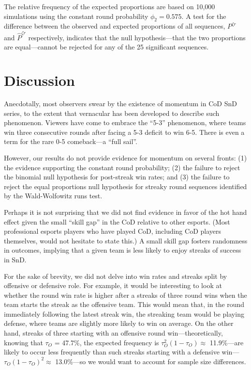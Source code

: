\documentclass{article}
\begin{document}
The relative frequency of the expected proportions are based on 10,000
simulations using the constant round probability \(\phi_2 = 0.575\). A
test for the difference between the observed and expected proportions of
all sequences, \(P^{\zeta r}\) and \(\hat{P}^{\zeta r}\) respectively,
indicates that the null hypothesis---that the two proportions are
equal---cannot be rejected for any of the 25 significant sequences.

\hypertarget{discussion}{%
\section{Discussion}\label{discussion}}

Anecdotally, most observers swear by the existence of momentum in CoD
SnD series, to the extent that vernacular has been developed to describe
such phenomenon. Viewers have come to embrace the ``5-3'' phenomenon,
where teams win three consecutive rounds after facing a 5-3 deficit to
win 6-5. There is even a term for the rare 0-5 comeback---a ``full
sail''.

However, our results do not provide evidence for momentum on several
fronts: (1) the evidence supporting the constant round probability; (2)
the failure to reject the binomial null hypothesis for post-streak win
rates; and (3) the failure to reject the equal proportions null
hypothesis for streaky round sequences identified by the Wald-Wolfowitz
runs test.

Perhaps it is not surprising that we did not find evidence in favor of
the hot hand effect given the small ``skill gap'' in the CoD relative to
other esports. (Most professional esports players who have played CoD,
including CoD players themselves, would not hesitate to state this.) A
small skill gap fosters randomness in outcomes, implying that a given
team is less likely to enjoy streaks of success in SnD.

For the sake of brevity, we did not delve into win rates and streaks
split by offensive or defensive role. For example, it would be
interesting to look at whether the round win rate is higher after a
streaks of three round wins when the team starts the streak as the
offensive team. This would mean that, in the round immediately following
the latest streak win, the streaking team would be playing defense,
where teams are slightly more likely to win on average. On the other
hand, streaks of three starting with an offensive round
win---theoretically, knowing that \(\tau_O\) = 47.7\%, the expected
frequency is \(\tau_O^2 (1 - \tau_O) \approx\) 11.9\%---are likely to
occur less frequently than such streaks starting with a defensive
win---\(\tau_O (1 - \tau_O)^2 \approx\) 13.0\%---so we would want to
account for sample size differences.
\end{document}

